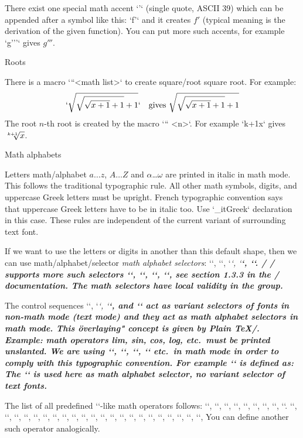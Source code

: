 There exist one special math accent `'` (single quote, ASCII 39)
which can be appended after a symbol like this: `f'`
and it creates $f'$ (typical meaning is the
derivation of the given function). You can put more such accents, for
example `g'''` gives $g'''$.

\secc Roots

There is a macro \x`\sqrt``{<math list>}` to create \ii square/root square root. For example:
$$
  `\sqrt{\sqrt{\sqrt{x+1}+1}+1}` \quad \hbox{gives }
   \sqrt{\sqrt{\sqrt{x+1}+1}+1}
$$
The \ii root $n$-th root is created by the macro \x`\root`` <n>`. For
example `\root k+1\of x` gives $\root k+1\of x$.

\secc Math alphabets

Letters \ii math/alphabet $a\dots z$, $A\dots Z$ and $\alpha$\dots$\omega$ are printed in italic
in math mode. This follows the traditional typographic rule.
All other math symbols, digits, and uppercase Greek letters must be
upright.\fnote
{French typographic convention says that uppercase Greek letters have to be
 in italic too. Use `\_itGreek` declaration in this case.}
These rules are independent of the current variant of surrounding text font.

If we want to use the letters or digits
in another than this default shape, then we can use
\ii math/alphabet/selector {\em math alphabet selectors}:
\x`\mit`, \x`\rm`, \x`\it`, \x`\bf`, \x`\cal`.
\new \OpTeX/
\OpTeX/ supports more such selectors \x`\script`, \x`\frak`, \x`\bbchar`, \x`\bi`, see
section 1.3.3 in the \OpTeX/ documentation. The math selectors have local
validity in the group.

The control sequences \x`\rm`, \x`\it`, \x`\bf`, and \x`\bi` act as variant selectors
of fonts in non-math mode (text mode) and they act
as math alphabet selectors in math mode. This \"overlaying" concept
is given by Plain \TeX/. Example: math operators lim, sin, cos,
log, etc.\ must be printed unslanted. We are using `\lim`, `\sin`, `\cos`,
`\log` etc.\ in math mode in order to comply with this typographic convention. For
example `\sin` is defined as:
\begtt
\def\sin {\mathop{\rm sin}\nolimits}
\endtt
The `\rm` is used here as math alphabet selector, no variant selector of
text fonts.

The list of all predefined `\rm`-like math operators follows: \x`\arccos`,
\x`\arcsin`, \x`\arctan`, \x`\arg`, \x`\cos`, \x`\cosh`, \x`\cot`, \x`\coth`, \x`\deg`.
\x`\det`, \x`\dim`, \x`\exp`, \x`\gcd`, \x`\hom`, \x`\inf`, \x`\ker`, \x`\lg`, \x`\lim`,
\x`\liminf`, \x`\limsup`, \x`\ln`, \x`\log`, \x`\max`, \x`\min`, \x`\Pr`, \x`\scs`, \x`\sin`,
\x`\sinh`, \x`\sup`, \x`\tan`, \x`\tanh`, You can define another such operator
analogically.

